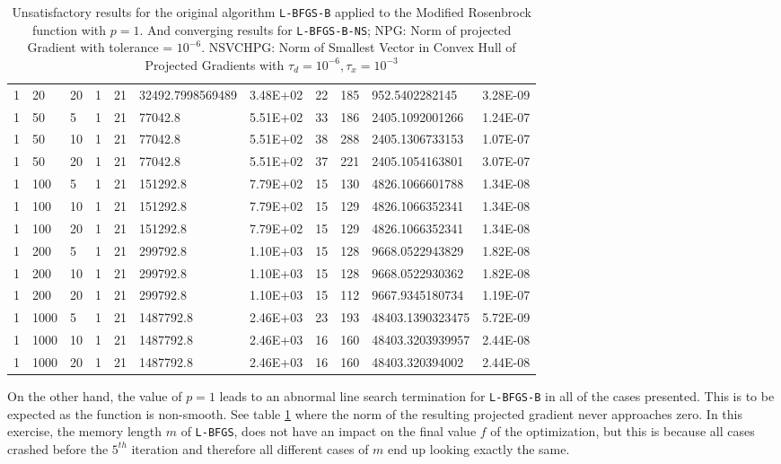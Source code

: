 \begin{table}
\begin{center}
\begin{tabular}{|l|l|l|l|l|l|l|l|l|l|l|}
    1 &   20 & 20  & 1 & 21 & 32492.7998569489 & 3.48E+02 & 22 & 185 & 952.5402282145 & 3.28E-09\\
    1 &   50 & 5  & 1 & 21 & 77042.8 & 5.51E+02 & 33 & 186 & 2405.1092001266 & 1.24E-07\\
    1 &   50 & 10  & 1 & 21 & 77042.8 & 5.51E+02 & 38 & 288 & 2405.1306733153 & 1.07E-07\\
     1 &  50 & 20  & 1 & 21 & 77042.8 & 5.51E+02 & 37 & 221 & 2405.1054163801 & 3.07E-07\\
    1 &   100 & 5  & 1 & 21 & 151292.8 & 7.79E+02 & 15 & 130 & 4826.1066601788 & 1.34E-08\\
     1 &  100 & 10  & 1 & 21 & 151292.8 & 7.79E+02 & 15 & 129 & 4826.1066352341 & 1.34E-08\\
     1 &  100 & 20  & 1 & 21 & 151292.8 & 7.79E+02 & 15 & 129 & 4826.1066352341 & 1.34E-08\\
     1 &  200 & 5  & 1 & 21 & 299792.8 & 1.10E+03 & 15 & 128 & 9668.0522943829 & 1.82E-08\\
     1 &  200 & 10  & 1 & 21 & 299792.8 & 1.10E+03 & 15 & 128 & 9668.0522930362 & 1.82E-08\\
     1 &  200 & 20  & 1 & 21 & 299792.8 & 1.10E+03 & 15 & 112 & 9667.9345180734 & 1.19E-07\\
     1 &  1000 & 5  & 1 & 21 & 1487792.8 & 2.46E+03 & 23 & 193 & 48403.1390323475 & 5.72E-09\\
     1 &  1000 & 10  & 1 & 21 & 1487792.8 & 2.46E+03 & 16 & 160 & 48403.3203939957 & 2.44E-08\\
     1 &  1000 & 20  & 1 & 21 & 1487792.8 & 2.46E+03 & 16 & 160 & 48403.320394002 & 2.44E-08\\
      \hline
    \end{tabular}
    \caption[Modified Rosenbrock with $p = 1$]{Unsatisfactory results for the original algorithm \texttt{L-BFGS-B} applied to the Modified Rosenbrock function with $p = 1$. And converging results for \texttt{L-BFGS-B-NS}; NPG: Norm of projected Gradient with tolerance = $10^{-6}$. NSVCHPG: Norm of Smallest Vector in Convex Hull of Projected Gradients with $\tau_d = 10^{-6}, \tau_x = 10^{-3}$}
    \label{pequal1merged}
  \end{center}
\end{table}

On the other hand, the value of $p = 1$ leads to an abnormal line search termination for \texttt{L-BFGS-B} in all of the cases presented. This is to be expected as the function is non-smooth. See table \ref{pequal1merged} where the norm of the resulting projected gradient never approaches zero. In this exercise, the memory length $m$ of \texttt{L-BFGS}, does not have an impact on the final value $f$ of the optimization, but this is because all cases crashed before the $5^{th}$ iteration and therefore all different cases of $m$ end up looking exactly the same.


